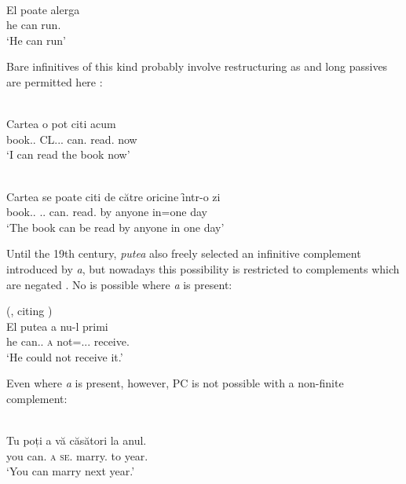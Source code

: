 \documentclass[output=paper]{langsci/langscibook}
\begin{document}
\ea%
    \label{ex:key:24.35}  \citep[136]{PanaDindelegan2013}\\
	\gll El poate alerga\\
		he can run.\Inf{}\\
	\glt ‘He can run’
\z

Bare infinitives of this kind probably involve restructuring as 
and long passives are permitted here \citep[194, 196]{Dragomirescu2013}:

\ea%
    \label{ex:key:24.36}\\
	\gll Cartea     o       pot   citi   acum\\
        book.\Def{}.\Acc{}   CL.\Acc{}.\glossF.\Tsg{}   can.\Fsg{}   read.\Inf{} now\\
	\glt ‘I can read the book now’
\z

\ea%
    \label{ex:key:24.37}\\
	\gll Cartea     se          poate      citi   de {către oricine} ȋntr-o zi\\
    book.\Def{}.\Nom{}   \Cl.\Refl.\Pass{} can.\Tsg{} read.\Inf{}   by anyone   in=one day\\
	\glt ‘The book can be read by anyone in one day’
\z

Until the 19th century, \emph{putea} also freely selected an infinitive
complement introduced by \emph{a}, but nowadays this possibility is restricted
to complements which are negated \citep{Dragomirescu2013}. No 
is possible where \emph{a} is present:

\ea%
    \label{ex:key:24.38} (\citealt[194]{PanaDindelegan2013}, citing \citealt[60]{Jordan2009})\\
	\gll El putea       a   nu-l       primi\\
    he can.\Ipfv{}.\Tsg{}   \textsc{a}   not=\Cl.\Acc{}.\M.\Tsg{}   receive.\Inf{}\\
	\glt ‘He could not receive it.’
\z

Even where \emph{a} is present, however, \gls{PC} is not possible with a non-finite complement:

\ea%
    \label{ex:key:24.39}\\
	\gll \llap{*}Tu   poți   a vă     căsători   la anul.\\
        you   can.\Ssg{} \textsc{a} \textsc{se}.\Spl{}  marry.\Inf{}   to year.\Def{}\\
    \glt ‘You can marry next year.’
\z
\end{document}
